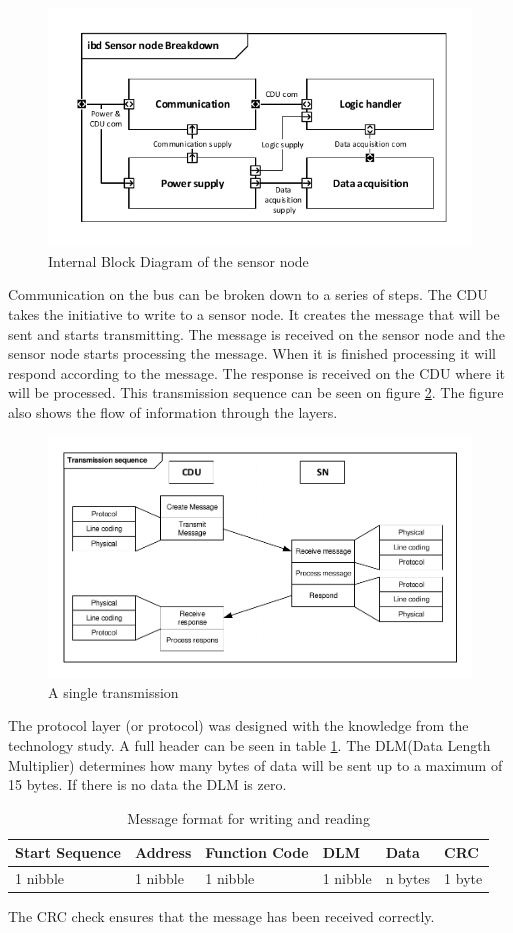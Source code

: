 \begin{figure}[hbpt]
\centering
\includegraphics[width=.8\textwidth]{billeder/11ProjectDescription/Sensor_IBD}
\caption{Internal Block Diagram of the sensor node}
\label{fig:SN_IBD}
\end{figure}
Communication on the bus can be broken down to a series of steps. The CDU takes the initiative to write to a sensor node. It creates the message that will be sent and starts transmitting. The message is received on the sensor node and the sensor node starts processing the message. When it is finished processing it will respond according to the message. The response is received on the CDU where it will be processed. This transmission sequence can be seen on figure \ref{fig:sintrans}. The figure also shows the flow of information through the layers. 
\begin{figure}[hbpt]
\centering
\includegraphics[width=.8\textwidth]{billeder/11ProjectDescription/singletransmission}
\caption{A single transmission}
\label{fig:sintrans}
\end{figure}
The protocol layer (or protocol) was designed with the knowledge from the technology study. A full header can be seen in table \ref{table:stdmsgtosensor}. The DLM(Data Length Multiplier) determines how many bytes of data will be sent up to a maximum of 15 bytes. If there is no data the DLM is zero.
\begin{table}[hbpt]
\centering
\begin{tabular}{|l|l|l|l|l|l|}
	\hline
	Start Sequence & Address & Function Code & DLM & Data & CRC  \\ \hline
	1 nibble & 1 nibble	& 1 nibble & 1 nibble & n bytes & 1 byte\\
	\hline
\end{tabular}
\caption{Message format for writing and reading}
\label{table:stdmsgtosensor}
\end{table}
The CRC check ensures that the message has been received correctly.

